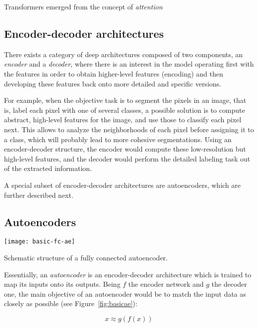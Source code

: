 Transformers  emerged from the concept of \textit{attention}

\subsection{Encoder-decoder architectures}

There exists a category of deep architectures composed of two components, an \textit{encoder} and a \textit{decoder}, where there is an interest in the model operating first with the features in order to obtain higher-level features (encoding) and then developing these features back onto more detailed and specific versions.

For example, when the objective task is to segment the pixels in an image, that is, label each pixel with one of several classes, a possible solution is to compute abstract, high-level features for the image, and use those to classify each pixel next. This allows to analyze the neighborhoods of each pixel before assigning it to a class, which will probably lead to more cohesive segmentations. Using an encoder-decoder structure, the encoder would compute these low-resolution but high-level features, and the decoder would perform the detailed labeling task out of the extracted information.

A special subset of encoder-decoder architectures are autoencoders, which are further described next.

\subsection{Autoencoders}

\begin{marginfigure}
    \texttt{[image: basic-fc-ae]}
    \caption{\label{fig:basicae}Schematic structure of a fully connected autoencoder.}
\end{marginfigure}

Essentially, an \textit{autoencoder} is an encoder-decoder architecture which is trained to map its inputs onto its outputs. Being $f$ the encoder network and $g$ the decoder one, the main objective of an autoencoder would be to match the input data as closely as possible (see Figure~\ref{fig:basicae}):

\begin{equation}
    x\approx g(f(x))
\end{equation}

